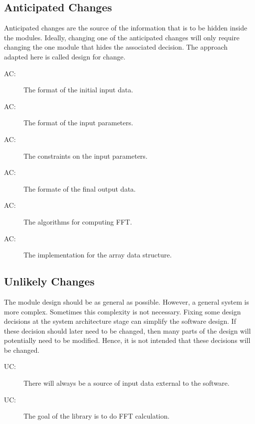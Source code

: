 \documentclass[12pt, titlepage]{article}
\newcounter{acnum}
\newcommand{\actheacnum}{AC\theacnum}
\newcounter{ucnum}
\newcommand{\uctheucnum}{UC\theucnum}
\begin{document}
\subsection{Anticipated Changes} \label{SecAchange}

Anticipated changes are the source of the information that is to be hidden
inside the modules. Ideally, changing one of the anticipated changes will only
require changing the one module that hides the associated decision. The approach
adapted here is called design for
change.

\begin{description}
\item[ \actheacnum \label{acInput}:] The format of the initial input data.
\item[ \actheacnum \label{acInputPara}:] The format of the input parameters.
\item[ \actheacnum \label{acInputcons}:] The constraints on the input parameters.
\item[ \actheacnum \label{acOutput}:] The formate of the final output data.
\item[ \actheacnum \label{acAlgorithm}:] The algorithms for computing FFT.
\item[ \actheacnum \label{acDataStructure}:] The implementation for the array data structure.
\end{description}

\subsection{Unlikely Changes} \label{SecUchange}

The module design should be as general as possible. However, a general system is
more complex. Sometimes this complexity is not necessary. Fixing some design
decisions at the system architecture stage can simplify the software design. If
these decision should later need to be changed, then many parts of the design
will potentially need to be modified. Hence, it is not intended that these
decisions will be changed.

\begin{description}
\item[ \uctheucnum \label{ucInput}:] There will always be
  a source of input data external to the software.
\item[ \uctheucnum \label{ucGoal}:] The goal of the library is to do FFT calculation. 

\end{description}
\end{document}
